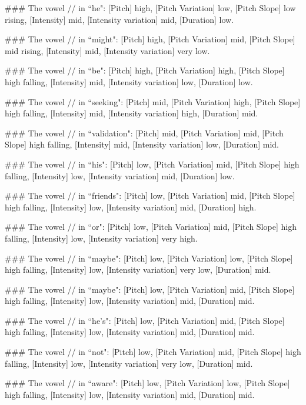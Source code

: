 \begin{tcolorbox}[blue_box, title = {{Example: Vowel-level Acoustic Feature}}]
\#\#\# The vowel // in ``he": [Pitch] high, [Pitch Variation] low, [Pitch Slope] low rising, [Intensity] mid, [Intensity variation] mid, [Duration] low.

\#\#\# The vowel // in ``might": [Pitch] high, [Pitch Variation] mid, [Pitch Slope] mid rising, [Intensity] mid, [Intensity variation] very low.

\#\#\# The vowel // in ``be": [Pitch] high, [Pitch Variation] high, [Pitch Slope] high falling, [Intensity] mid, [Intensity variation] low, [Duration] low.

\#\#\# The vowel // in ``seeking": [Pitch] mid, [Pitch Variation] high, [Pitch Slope] high falling, [Intensity] mid, [Intensity variation] high, [Duration] mid.

\#\#\# The vowel // in ``validation": [Pitch] mid, [Pitch Variation] mid, [Pitch Slope] high falling, [Intensity] mid, [Intensity variation] low, [Duration] mid.

\#\#\# The vowel // in ``his": [Pitch] low, [Pitch Variation] mid, [Pitch Slope] high falling, [Intensity] low, [Intensity variation] mid, [Duration] low.

\#\#\# The vowel // in ``friends": [Pitch] low, [Pitch Variation] mid, [Pitch Slope] high falling, [Intensity] low, [Intensity variation] mid, [Duration] high.

\#\#\# The vowel // in ``or": [Pitch] low, [Pitch Variation] mid, [Pitch Slope] high falling, [Intensity] low, [Intensity variation] very high.

\#\#\# The vowel // in ``maybe": [Pitch] low, [Pitch Variation] low, [Pitch Slope] high falling, [Intensity] low, [Intensity variation] very low, [Duration] mid.

\#\#\# The vowel // in ``maybe": [Pitch] low, [Pitch Variation] mid, [Pitch Slope] high falling, [Intensity] low, [Intensity variation] mid, [Duration] mid.

\#\#\# The vowel // in ``he's": [Pitch] low, [Pitch Variation] mid, [Pitch Slope] high falling, [Intensity] low, [Intensity variation] mid, [Duration] mid.

\#\#\# The vowel // in ``not": [Pitch] low, [Pitch Variation] mid, [Pitch Slope] high falling, [Intensity] low, [Intensity variation] very low, [Duration] mid.

\#\#\# The vowel // in ``aware": [Pitch] low, [Pitch Variation] low, [Pitch Slope] high falling, [Intensity] low, [Intensity variation] mid, [Duration] mid.


\end{tcolorbox}
